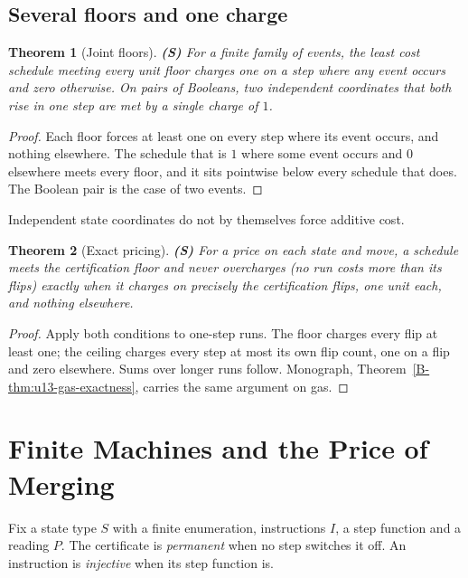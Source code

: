 \documentclass[11pt, a4paper]{report}
\theoremstyle{definition}
\theoremstyle{plain}
\newtheorem{theorem}{Theorem}[chapter]
\newcommand{\cert}{P}
\begin{document}
\section{Several floors and one charge}

\begin{theorem}[Joint floors] \textbf{(S)}
For a finite family of events, the least cost schedule meeting every unit floor charges one on a step where any event occurs and zero otherwise. On pairs of Booleans, two independent coordinates that both rise in one step are met by a single charge of $1$.
\end{theorem}
\begin{proof}
Each floor forces at least one on every step where its event occurs, and nothing elsewhere. The
schedule that is $1$ where some event occurs and $0$ elsewhere meets every floor, and it sits
pointwise below every schedule that does. The Boolean pair is the case of two events.
\end{proof}

Independent state coordinates do not by themselves force additive cost.

\begin{theorem}[Exact pricing] \textbf{(S)}
For a price on each state and move, a schedule meets the certification floor and never overcharges (no run costs more than its flips) exactly when it charges on precisely the certification flips, one unit each, and nothing elsewhere.
\end{theorem}
\begin{proof}
Apply both conditions to one-step runs. The floor charges every flip at least one; the ceiling
charges every step at most its own flip count, one on a flip and zero elsewhere. Sums over longer
runs follow. Monograph, Theorem~\ref{B-thm:u13-gas-exactness}, carries the same argument on gas.
\end{proof}

\chapter{Finite Machines and the Price of Merging}\label{ch:finite}

Fix a state type $S$ with a finite enumeration, instructions $I$, a step function and a reading $\cert$. The certificate is \emph{permanent} when no step switches it off. An instruction is \emph{injective} when its step function is.
\end{document}
